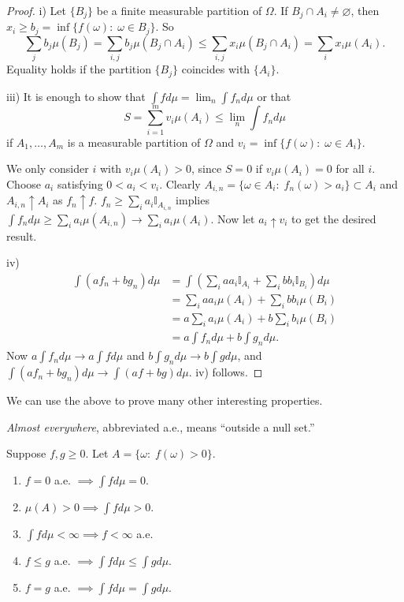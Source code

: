 \documentclass[11pt,fleqn]{book} %
\begin{document}
\begin{proof}
	i) Let $\{B_j\}$ be a finite measurable partition of $\Omega$. If $B_j \cap A_i \neq \varnothing$, then $x_i \geq b_j = \inf \{f(\omega):\;\omega \in B_j\}$. So
	\[
		\sum_j b_j \mu(B_j) = \sum_{i,j} b_j \mu(B_j \cap A_i) \leq \sum_{i,j} x_i \mu(B_j \cap A_i) = \sum_i x_i \mu(A_i).
	\]
	Equality holds if the partition $\{B_j\}$ coincides with $\{A_i\}$.

	iii) It is enough to show that $\int f d\mu = \lim_n \int f_n d\mu$ or that
	\[
		S = \sum_{i=1}^m v_i \mu(A_i) \leq \lim_n \int f_n d\mu
	\]
	if $A_1,\dots,A_m$ is a measurable partition of $\Omega$ and $v_i = \inf \{f(\omega):\;\omega \in A_i\}$.

	We only consider $i$ with $v_i \mu(A_i) > 0$, since $S=0$ if $v_i \mu(A_i) = 0$ for all $i$. Choose $a_i$ satisfying $0 < a_i < v_i$. Clearly $A_{i,n} = \{\omega \in A_i:\;f_n(\omega) > a_i\} \subset A_i$ and $A_{i,n} \uparrow A_i$ as $f_n \uparrow f$. $f_n \geq \sum_i a_i\mathbb{I}_{A_{i,n}}$ implies $\int f_n d\mu \geq \sum_i a_i \mu(A_{i,n}) \to \sum_i a_i \mu(A_i)$. Now let $a_i \uparrow v_i$ to get the desired result.

	iv) \begin{align*}
		\int (af_n + bg_n) d\mu &= \int (\sum_i aa_i \mathbb{I}_{A_i} + \sum_i bb_i \mathbb{I}_{B_i}) d\mu \\
		&= \sum_i aa_i \mu(A_i) + \sum_i bb_i \mu(B_i) \\
		&= a \sum_i a_i \mu(A_i) + b \sum_i b_i \mu(B_i) \\
		&= a \int f_n d\mu + b \int g_n d\mu.
	\end{align*}
	Now $a \int f_n d\mu \to a \int f d\mu$ and $b \int g_n d\mu \to b \int g d\mu$, and $\int (af_n + bg_n) d\mu \to \int (af + bg) d\mu$. iv) follows.
\end{proof}

We can use the above to prove many other interesting properties.

\begin{notation}
	\emph{Almost everywhere}, abbreviated a.e., means ``outside a null set.''
\end{notation}

\begin{theorem} \label{thm:integral-properties-2}
	Suppose $f,g \geq 0$. Let $A = \{\omega:\;f(\omega) > 0\}$.
	\begin{enumerate}[label=\roman*)]
		\item $f=0$ a.e. $\implies \int f d\mu = 0$.
		\item $\mu(A) > 0 \implies \int f d\mu > 0$.
		\item $\int f d\mu < \infty \implies f < \infty$ a.e.
		\item $f \leq g$ a.e. $\implies \int f d\mu \leq \int g d\mu$.
		\item $f = g$ a.e. $\implies \int f d\mu = \int g d\mu$.
	\end{enumerate}
\end{theorem}
\end{document}
